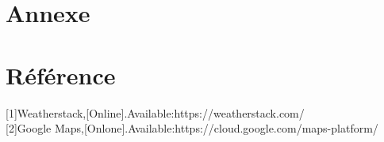 \documentclass[14px]{article}
\begin{document}
\section{Annexe}
\begin{figure1}
\end{figure1}

\begin{figure1}
\end{figure1}
\section{Référence}
[1]Weatherstack,[Online].Available:https://weatherstack.com/\\

[2]Google Maps,[Onlone].Available:https://cloud.google.com/maps-platform/\\
\end{document}
